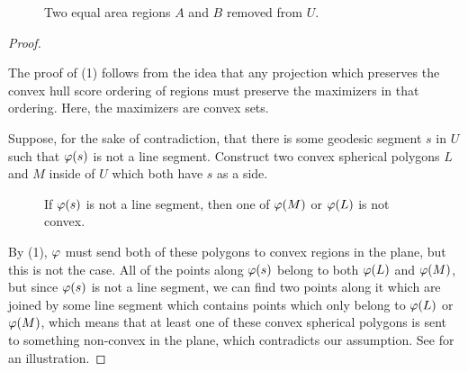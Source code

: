 \ifsmallfigs
\else
\begin{figure}[h]
	\centering
	
	\caption{Two equal area regions $A$ and $B$ removed from $U$.}
	\label{fig:ch_schema}
\end{figure}
\fi


\begin{proof}
	\ \\
	
	\vspace*{-2em}

		The proof of (1) follows from the idea that any projection which preserves the convex hull score ordering of regions must 
		preserve the maximizers in that ordering.   Here, the maximizers are convex sets.
		
		 Suppose, for the sake of contradiction, that there is some geodesic segment $s$ in $U$ such that $\varphi(s)$ is not a line segment. Construct two convex spherical polygons $L$ and $M$ inside of $U$ which both have $s$ as a side. 




\ifsmallfigs
\begin{figure}
	\centering
	\begin{minipage}{.5\textwidth}
		\centering
	\resizebox{.95\textwidth}{!}{}	
	\label{fig:ch_schema}
	\end{minipage}%
	\begin{minipage}{.5\textwidth}
		\centering
		\resizebox{1.15\textwidth}{!}{}
\label{fig:lineconvexcont}
	\end{minipage}
\end{figure}
\fi





		
\ifsmallfigs
\else		
\begin{figure}[h]
	\centering
	
	\caption{If $\varphi(s)$ is not a line segment, then one of $\varphi(M)$ or $\varphi(L)$ is not convex.}
	\label{fig:lineconvexcont}
\end{figure}
\fi
		 By (1), $\varphi$ must send both of these polygons to convex regions in the plane, but this is not the case.  All of the points along $\varphi(s)$ belong to both $\varphi(L)$ and $\varphi(M)$, but since $\varphi(s)$ is not a line segment, we can find two points along it which are joined by some line segment which contains points which only belong to $\varphi(L)$ or $\varphi(M)$, which means that at least one of these convex spherical polygons is sent to something non-convex in the plane, which contradicts our assumption.		See  for an illustration.
		

\end{proof}
